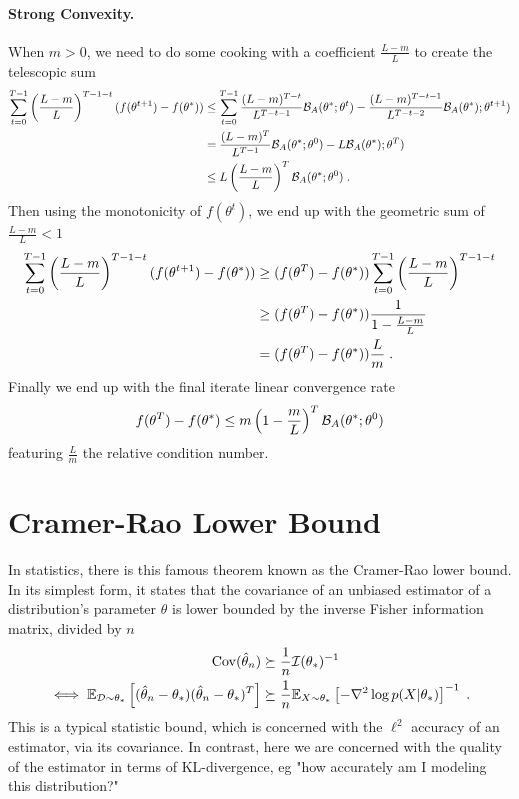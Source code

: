 \documentclass{article}
\newcommand*{\expect}[2][]{\ensuremath{\mathbb{E}_{#1} \left[ #2 \right] }} %
\newcommand{\logpart}{A}
\newcommand{\bregman}{\cB_\logpart}
\newcommand{\natp}{\theta}
\begin{document}
\paragraph{Strong Convexity.} 
When $m>0$, we need to do some cooking with a coefficient $\frac{L-m}{L}$ to create the telescopic sum
\begin{align}
	\sum_{t=0}^{T-1} \left( \frac{L-m}{L} \right)^{T-1-t} (f(\natp^{t+1}) - f(\natp^*)) 
	&\leq \sum_{t=0}^{T-1} \frac{( L-m)^{T-t}}{L^{T-t -1}} \bregman(\natp^{*}; \natp^{t}) 
	- \frac{( L-m)^{T-t-1}}{L^{T-t-2}} \bregman(\natp^{*}); \natp^{t+1}) \\
	&= \frac{( L-m)^{T}}{L^{T-1}}  \bregman(\natp^{*}; \natp^{0}) 
	- L \bregman(\natp^{*}); \natp^{T}) \\
	&\leq L \left( \frac{L-m}{L} \right)^T \bregman(\natp^{*}; \natp^{0}) \; .
\end{align}
Then using the monotonicity of $f(\natp^t)$, we end up with the geometric sum of $\frac{L-m}{L} < 1$
\begin{align}
		\sum_{t=0}^{T-1} \left( \frac{L-m}{L} \right)^{T-1-t} (f(\natp^{t+1}) - f(\natp^*)) 
		&\geq (f(\natp^{T}) - f(\natp^*)) \sum_{t=0}^{T-1} \left( \frac{L-m}{L} \right)^{T-1-t} \\
		&\geq (f(\natp^{T}) - f(\natp^*)) \inv{1 - \frac{L-m}{L}} \\
		&= (f(\natp^{T}) - f(\natp^*)) \frac{L}{m} \; .
\end{align}
Finally we end up with the final iterate linear convergence rate
\begin{align}
	f(\natp^{T}) - f(\natp^*)
	\leq m  \left( 1 - \frac{m}{L} \right)^T \bregman(\natp^{*}; \natp^{0}) 
\end{align}
featuring $\frac{L}{m} $ the relative condition number.

\section{Cramer-Rao Lower Bound}
In statistics, there is this famous theorem known as the Cramer-Rao lower bound. In its simplest form, it states that the covariance of an unbiased estimator of a distribution's parameter $\natp$ is lower bounded by the inverse Fisher information matrix, divided by $n$
\begin{align}
    \Cov(\hat \natp_n)  
    &\succeq \inv{n} \cI(\natp_*)^{-1} \\
    \iff
    \expect[\cD\sim \natp_*]{(\hat \natp_n - \natp_*)(\hat \natp_n - \natp_*)^T}
    &\succeq \inv{n} \expect[X\sim \natp_*]{-\nabla^2 \log p(X|\natp_*)}^{-1} \; .
\end{align}
This is a typical statistic bound, which is concerned with the $\ell^2$ accuracy of an estimator, via its covariance. In contrast, here we are concerned with the quality of the estimator in terms of KL-divergence, eg "how accurately am I modeling this distribution?"
\end{document}
